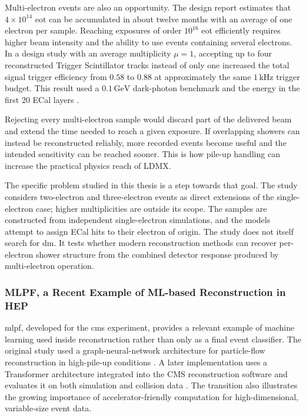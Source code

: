 Multi-electron events are also an opportunity. The design report estimates
that \(4\times10^{14}\) \gls{eot} can be accumulated in about twelve months
with an average of one electron per sample. Reaching exposures of order
\(10^{16}\) \gls{eot} efficiently requires higher beam intensity and the
ability to use events containing several electrons. In a design study with
an average multiplicity \(\mu=1\), accepting up to four reconstructed
Trigger Scintillator tracks instead of only one increased the total signal
trigger efficiency from \(0.58\) to \(0.88\) at approximately the same
\(1\,\mathrm{kHz}\) trigger budget. This result used a
\(0.1\,\mathrm{GeV}\) dark-photon benchmark and the energy in the first 20
ECal layers \cite{ldmx2025-overview}.


Rejecting every multi-electron sample would discard part of the delivered
beam and extend the time needed to reach a given exposure. If overlapping
showers can instead be reconstructed reliably, more recorded events become
useful and the intended sensitivity can be reached sooner. This is how
pile-up handling can increase the practical physics reach of LDMX.

The specific problem studied in this thesis is a step towards that goal. The
study considers two-electron and three-electron events as direct extensions
of the single-electron case; higher multiplicities are outside its scope. The
samples are constructed from independent single-electron simulations, and
the models attempt to assign ECal hits to their electron of origin. The study
does not itself search for \gls{dm}. It tests whether modern reconstruction
methods can recover per-electron shower structure from the combined detector
response produced by multi-electron operation.

\subsubsection{MLPF, a Recent Example of ML-based Reconstruction in HEP}

\Gls{mlpf}, developed for the \gls{cms} experiment, provides a relevant
example of machine learning used inside reconstruction rather than only as a
final event classifier. The original study used a graph-neural-network
architecture for particle-flow reconstruction in high-pile-up conditions
\cite{pata2021-mlpf}. A later implementation uses a Transformer architecture
integrated into the CMS reconstruction software and evaluates it on both
simulation and collision data \cite{pata2026-mlpf}. The transition also
illustrates the growing importance of accelerator-friendly computation for
high-dimensional, variable-size event data.

